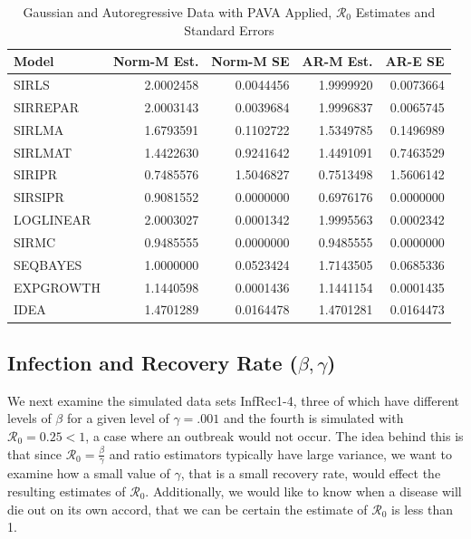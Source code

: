 \documentclass[12pt]{article}
\newcommand{\rr}{\ensuremath{\mathcal{R}_0}}
\begin{document}
\begin{table}[H]
	
	\centering
	\begin{tabular}[t]{l|r|r|r|r}
		\hline
		Model & Norm-M Est. & Norm-M SE & AR-M Est. & AR-E SE\\
		\hline
		SIRLS & 2.0002458 & 0.0044456 & 1.9999920 & 0.0073664\\
		\hline
		SIRREPAR & 2.0003143 & 0.0039684 & 1.9996837 & 0.0065745\\
		\hline
		SIRLMA & 1.6793591 & 0.1102722 & 1.5349785 & 0.1496989\\
		\hline
		SIRLMAT & 1.4422630 & 0.9241642 & 1.4491091 & 0.7463529\\
		\hline
		SIRIPR & 0.7485576 & 1.5046827 & 0.7513498 & 1.5606142\\
		\hline
		SIRSIPR & 0.9081552 & 0.0000000 & 0.6976176 & 0.0000000\\
		\hline
		LOGLINEAR & 2.0003027 & 0.0001342 & 1.9995563 & 0.0002342\\
		\hline
		SIRMC & 0.9485555 & 0.0000000 & 0.9485555 & 0.0000000\\
		\hline
		SEQBAYES & 1.0000000 & 0.0523424 & 1.7143505 & 0.0685336\\
		\hline
		EXPGROWTH & 1.1440598 & 0.0001436 & 1.1441154 & 0.0001435\\
		\hline
		IDEA & 1.4701289 & 0.0164478 & 1.4701281 & 0.0164473\\
		\hline
	\end{tabular}
\caption{Gaussian and Autoregressive Data with PAVA Applied, $\rr$ Estimates and Standard Errors}\label{tab:pava-res}
\end{table}

\subsection{Infection and Recovery Rate ($\beta, \gamma$)}\label{sec:res-beta-gamma}

We next examine the simulated data sets InfRec1-4, three of which have different levels of $\beta$ for a given level of $\gamma=.001$ and the fourth is simulated with $\rr=0.25 < 1$, a case where an outbreak would not occur.  The idea behind this is that since $\rr=\frac{\beta}{\gamma}$ and ratio estimators typically have large variance, we want to examine how a small value of $\gamma$, that is a small recovery rate, would effect the resulting estimates of $\rr$.  Additionally, we would like to know when a disease will die out on its own accord, that we can be certain the estimate of $\rr$ is less than 1.
\end{document}
